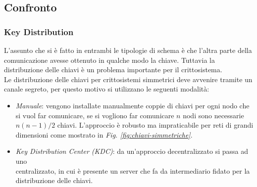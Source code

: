 \subsection{Confronto}

\subsubsection*{Key Distribution}

L'assunto che si è fatto in entrambi le tipologie di schema è che l'altra parte della comunicazione avesse ottenuto in qualche modo la chiave. Tuttavia la distribuzione
delle chiavi è un problema importante per il crittosistema. \\

\noindent
Le distribuzione delle chiavi per crittosistemi simmetrici deve avvenire tramite un canale segreto, per questo motivo si utilizzano le seguenti modalità:
\begin{itemize}
    \item \textit{Manuale}: vengono installate manualmente coppie di chiavi per ogni nodo che si vuol far comunicare, se si vogliono far comunicare $n$ nodi 
    sono necessarie $n(n-1)/2$ chiavi. L'approccio è robusto ma impraticabile per reti di grandi dimensioni come mostrato in \textit{Fig. \ref{fig:chiavi-simmetriche}}.
    \item \textit{Key Distribution Center (KDC)}: da un'approccio decentralizzato si passa ad uno \\centralizzato, in cui è presente un server che fa da intermediario
    fidato per la distribuzione delle chiavi.
\end{itemize}

